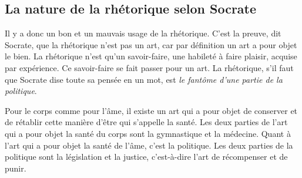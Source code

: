 \subsection*{La nature de la rhétorique selon Socrate}

Il y a donc un bon et un mauvais usage de la rhétorique. C'est la preuve, dit Socrate, que la rhétorique n'est pas un art, car par définition un art a pour objet le bien. La rhétorique n'est qu'un savoir-faire, une habileté à faire plaisir, acquise par expérience. Ce savoir-faire se fait passer pour un art. La rhétorique, s'il faut que Socrate dise toute sa pensée en un mot, est \emph{le fantôme d'une partie de la politique}.

Pour le corps comme pour l'âme, il existe un art qui a pour objet de conserver et de rétablir cette manière d'être qui s'appelle la santé. Les deux parties de l'art qui a pour objet la santé du corps sont la gymnastique et la médecine. Quant à l'art qui a pour objet la santé de l'âme, c'est la politique. Les deux parties de la politique sont la législation et la justice, c'est-à-dire l'art de récompenser et de punir.

%
%
%
